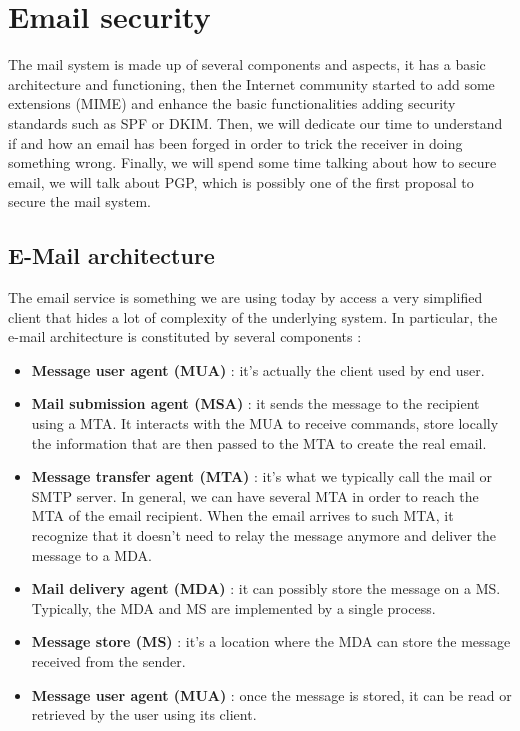\section{Email security}
The mail system is made up of several components and aspects, it has a basic architecture and functioning, then the Internet community started to add some extensions (MIME) and enhance the basic functionalities adding security standards such as SPF or DKIM. Then, we will dedicate our time to understand if and how an email has been forged in order to trick the receiver in doing something wrong. Finally, we will spend some time talking about how to secure email, we will talk about PGP, which is possibly one of the first proposal to secure the mail system.

\subsection{E-Mail architecture}
The email service is something we are using today by access a very simplified client that hides a lot of complexity of the underlying system. In particular, the e-mail architecture is constituted by several components :
\begin{itemize}
\item \textbf{Message user agent (MUA)} : it's actually the client used by end user.
\item \textbf{Mail submission agent (MSA)} : it sends the message to the recipient using a MTA. It interacts with the MUA to receive commands, store locally the information that are then passed to the MTA to create the real email.
\item \textbf{Message transfer agent (MTA)} : it's what we typically call the mail or SMTP server. In general, we can have several MTA in order to reach the MTA of the email recipient. When the email arrives to such MTA, it recognize that it doesn't need to relay the message anymore and deliver the message to a MDA.
\item \textbf{Mail delivery agent (MDA)} : it can possibly store the message on a MS. Typically, the MDA and MS are implemented by a single process.
\item \textbf{Message store (MS)} : it's a location where the MDA can store the message received from the sender.
\item \textbf{Message user agent (MUA)} : once the message is stored, it can be read or retrieved by the user using its client.
\end{itemize} 
